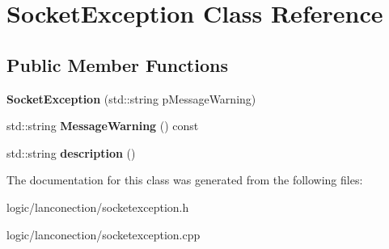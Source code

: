 \hypertarget{class_socket_exception}{\section{Socket\-Exception Class Reference}
\label{class_socket_exception}
}
\subsection*{Public Member Functions}
\begin{DoxyCompactItemize}
\item 
\hypertarget{class_socket_exception_a4af250ab41b48e6167696cafb5a97165}{{\bfseries Socket\-Exception} (std\-::string p\-Message\-Warning)}\label{class_socket_exception_a4af250ab41b48e6167696cafb5a97165}

\item 
\hypertarget{class_socket_exception_a95a03e3ba3d78d27d23f8d4100f59e00}{std\-::string {\bfseries Message\-Warning} () const }\label{class_socket_exception_a95a03e3ba3d78d27d23f8d4100f59e00}

\item 
\hypertarget{class_socket_exception_ad7920caebddc99b6bbb7dbede569fa18}{std\-::string {\bfseries description} ()}\label{class_socket_exception_ad7920caebddc99b6bbb7dbede569fa18}

\end{DoxyCompactItemize}


The documentation for this class was generated from the following files\-:\begin{DoxyCompactItemize}
\item 
logic/lanconection/socketexception.\-h\item 
logic/lanconection/socketexception.\-cpp\end{DoxyCompactItemize}
